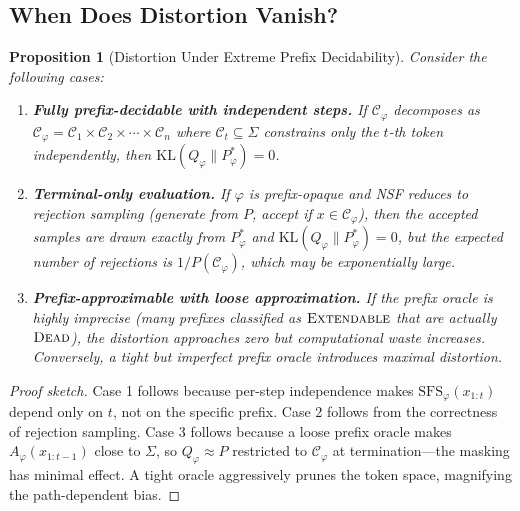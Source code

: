 \documentclass[twoside,11pt]{article}
\newtheorem{proposition}[theorem]{Proposition}
\newcommand{\Vocab}{\Sigma}
\newcommand{\Constraint}{\mathcal{C}}
\newcommand{\KL}{\mathrm{KL}}
\newcommand{\SFS}{\mathrm{SFS}}
\begin{document}
\subsection{When Does Distortion Vanish?}
\label{sec:distortion-vanish}

\begin{proposition}[Distortion Under Extreme Prefix Decidability]
\label{prop:distortion-vanish}
Consider the following cases:
\begin{enumerate}
    \item \textbf{Fully prefix-decidable with independent steps.} If
    $\Constraint_\varphi$ decomposes as $\Constraint_\varphi =
    \Constraint_1 \times \Constraint_2 \times \cdots \times \Constraint_n$
    where $\Constraint_t \subseteq \Vocab$ constrains only the $t$-th
    token independently, then $\KL(Q_\varphi \| P^*_\varphi) = 0$.

    \item \textbf{Terminal-only evaluation.} If $\varphi$ is prefix-opaque
    and NSF reduces to rejection sampling (generate from $P$, accept if
    $x \in \Constraint_\varphi$), then the accepted samples are drawn
    exactly from $P^*_\varphi$ and $\KL(Q_\varphi \| P^*_\varphi) = 0$,
    but the expected number of rejections is $1/P(\Constraint_\varphi)$,
    which may be exponentially large.

    \item \textbf{Prefix-approximable with loose approximation.} If the
    prefix oracle is highly imprecise (many prefixes classified as
    $\textsc{Extendable}$ that are actually $\textsc{Dead}$), the
    distortion approaches zero but computational waste increases.
    Conversely, a tight but imperfect prefix oracle introduces maximal
    distortion.
\end{enumerate}
\end{proposition}

\begin{proof}[Proof sketch]
Case 1 follows because per-step independence makes $\SFS_\varphi(x_{1:t})$
depend only on $t$, not on the specific prefix. Case 2 follows from the
correctness of rejection sampling. Case 3 follows because a loose prefix
oracle makes $A_\varphi(x_{1:t-1})$ close to $\Vocab$, so
$Q_\varphi \approx P$ restricted to $\Constraint_\varphi$ at
termination---the masking has minimal effect. A tight oracle aggressively
prunes the token space, magnifying the path-dependent bias.
\end{proof}
\end{document}
